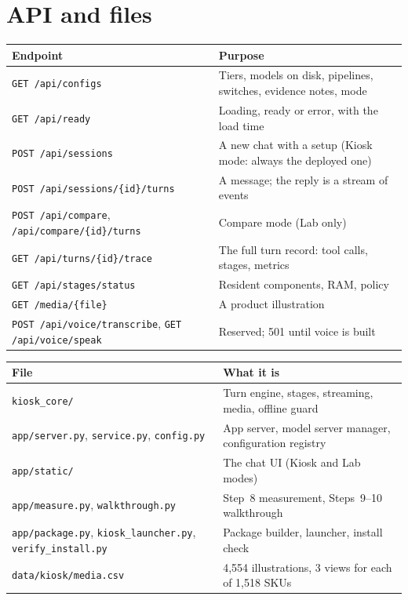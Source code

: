 \documentclass[11pt,a4paper]{article}
\begin{document}
\section{API and files}\label{app:api}
\begin{small}
\begin{tabularx}{\textwidth}{p{5.2cm} L}
\toprule
Endpoint & Purpose \\
\midrule
\texttt{GET /api/configs} & Tiers, models on disk, pipelines, switches, evidence notes, mode \\
\texttt{GET /api/ready} & Loading, ready or error, with the load time \\
\texttt{POST /api/sessions} & A new chat with a setup (Kiosk mode: always the deployed one) \\
\texttt{POST /api/sessions/\{id\}/turns} & A message; the reply is a stream of events \\
\texttt{POST /api/compare}, \texttt{/api/compare/\{id\}/turns} & Compare mode (Lab only) \\
\texttt{GET /api/turns/\{id\}/trace} & The full turn record: tool calls, stages, metrics \\
\texttt{GET /api/stages/status} & Resident components, RAM, policy \\
\texttt{GET /media/\{file\}} & A product illustration \\
\texttt{POST /api/voice/transcribe}, \texttt{GET /api/voice/speak} & Reserved; 501 until voice is built \\
\bottomrule
\end{tabularx}

\vspace{8pt}
\begin{tabularx}{\textwidth}{p{5.2cm} L}
\toprule
File & What it is \\
\midrule
\texttt{kiosk\_core/} & Turn engine, stages, streaming, media, offline guard \\
\texttt{app/server.py}, \texttt{service.py}, \texttt{config.py} & App server, model server manager, configuration registry \\
\texttt{app/static/} & The chat UI (Kiosk and Lab modes) \\
\texttt{app/measure.py}, \texttt{walkthrough.py} & Step~8 measurement, Steps~9--10 walkthrough \\
\texttt{app/package.py}, \texttt{kiosk\_launcher.py}, \texttt{verify\_install.py} & Package builder, launcher, install
check \\
\texttt{data/kiosk/media.csv} & 4,554 illustrations, 3 views for each of 1,518 SKUs \\
\bottomrule
\end{tabularx}
\end{small}
\end{document}
